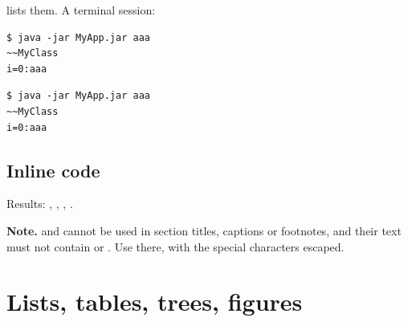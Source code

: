 \documentclass[11pt]{amsart}         %
\newcommand{\hNote}[1]{\par\smallskip\noindent\colorbox{codebg}{\parbox{\dimexpr\linewidth-2\fboxsep}{\small\raggedright\textbf{Note.} #1}}\par\smallskip}
\begin{document}
 lists them. A terminal session:

\begin{texcode}
\begin{lstlisting}[style=terminalstyle, frame=single, rulecolor=\color{termframe}, backgroundcolor=\color{termbg}, basicstyle=\ttfamily\footnotesize\color{termfg}]
$ java -jar MyApp.jar aaa
~~MyClass
i=0:aaa
\end{lstlisting}
\end{texcode}

\begin{lstlisting}[style=terminalstyle, frame=single, rulecolor=\color{termframe}, backgroundcolor=\color{termbg}, basicstyle=\ttfamily\footnotesize\color{termfg}]
$ java -jar MyApp.jar aaa
~~MyClass
i=0:aaa
\end{lstlisting}


\subsection{Inline code}

\begin{texcode}
\end{texcode}

Results:
,
,
,
.

\hNote{ and \hCode{\textbackslash hCodeB} cannot be used in section titles,
captions or footnotes, and their text must not contain \hCode{\%} or \hCode{\#}.
Use \hCode{\textbackslash hCode} there, with the special characters escaped.}




\section{Lists, tables, trees, figures}
\end{document}

